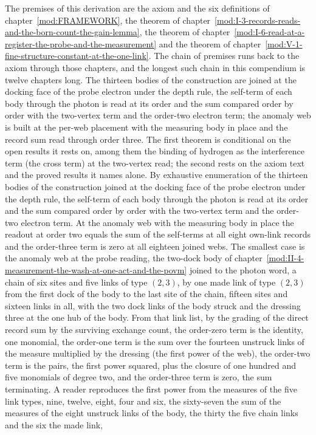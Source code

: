 \begin{chproof}[census]
The premises of this derivation are the axiom and the six definitions of chapter~\ref{mod:FRAMEWORK}, the theorem of chapter~\ref{mod:I-3-records-reads-and-the-born-count-the-gain-lemma}, the theorem of chapter~\ref{mod:I-6-read-at-a-register-the-probe-and-the-measurement} and the theorem of chapter~\ref{mod:V-1-fine-structure-constant-at-the-one-link}. The chain of premises runs back to the axiom through those chapters, and the longest such chain in this compendium is twelve chapters long.
The thirteen bodies of the construction are joined at the docking face of the probe electron under the depth rule, the self-term of each body through the photon is read at its order and the sum compared order by order with the two-vertex term and the order-two electron term; the anomaly web is built at the per-web placement with the measuring body in place and the record sum read through order three. The first theorem is conditional on the open results it rests on, among them the binding of hydrogen as the interference term (the cross term) at the two-vertex read; the second rests on the axiom text and the proved results it names alone.
By exhaustive enumeration of the thirteen bodies of the construction joined at the docking face of the probe electron under the depth rule, the self-term of each body through the photon is read at its order and the sum compared order by order with the two-vertex term and the order-two electron term. At the anomaly web with the measuring body in place the readout at order two equals the sum of the self-terms at all eight own-link records and the order-three term is zero at all eighteen joined webs. The smallest case is the anomaly web at the probe reading, the two-dock body of chapter~\ref{mod:II-4-measurement-the-wash-at-one-act-and-the-povm} joined to the photon word, a chain of six sites and five links of type $(2,3)$, by one made link of type $(2,3)$ from the first dock of the body to the last site of the chain, fifteen sites and sixteen links in all, with the two dock links of the body struck and the dressing three at the one hub of the body. From that link list, by the grading of the direct record sum by the surviving exchange count, the order-zero term is the identity, one monomial, the order-one term is the sum over the fourteen unstruck links of the measure multiplied by the dressing (the first power of the web), the order-two term is the pairs, the first power squared, plus the closure of one hundred and five monomials of degree two, and the order-three term is zero, the sum terminating. A reader reproduces the first power from the measures of the five link types, nine, twelve, eight, four and six, the sixty-seven the sum of the measures of the eight unstruck links of the body, the thirty the five chain links and the six the made link,

\end{chproof}
